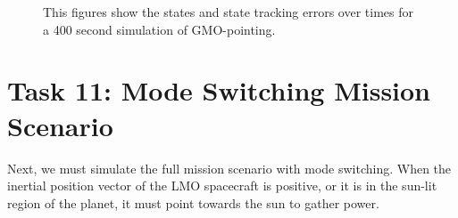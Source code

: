 \documentclass[paper]{aiaaNew}
\begin{document}
\begin{figure}[!htbp]
\centering     %
{}
\caption{This figures show the states and state tracking errors over times for a 400 second simulation of GMO-pointing.}
\end{figure}


\newpage
\section*{Task 11: Mode Switching Mission Scenario}
Next, we must simulate the full mission scenario with mode switching. When the inertial position vector of the LMO spacecraft is positive, or it is in the sun-lit region of the planet, it must point towards the sun to gather power.




\end{document}
